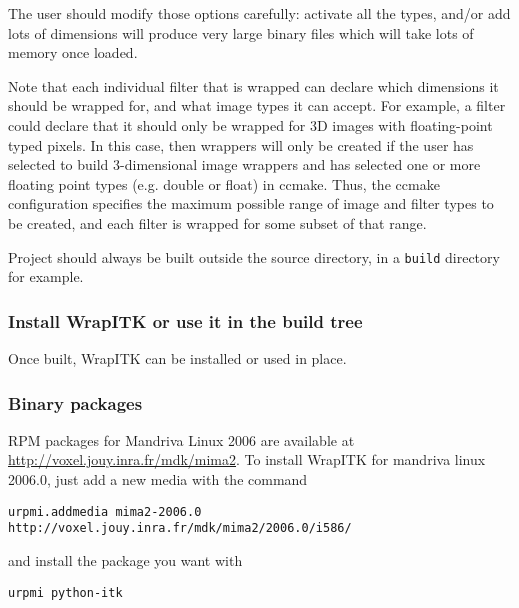 \documentclass{InsightArticle}
\begin{document}
The user should modify those options carefully: activate all the types, and/or
add lots of dimensions will produce very large binary files which will take lots
of memory once loaded.

Note that each individual filter that is wrapped can declare which dimensions it
should be wrapped for, and what image types it can accept. For example, a filter
could declare that it should only be wrapped for 3D images with floating-point
typed pixels. In this case, then wrappers will only be created if the user has
selected to build 3-dimensional image wrappers and has selected one or more
floating point types (e.g. double or float) in ccmake. Thus, the ccmake
configuration specifies the maximum possible range of image and filter types to
be created, and each filter is wrapped for some subset of that range. 

Project should always be built outside the source directory, in a \verb$build$
directory for example.

    \subsubsection{Install WrapITK or use it in the build tree}

Once built, WrapITK can be installed or used in place.

    \subsubsection{Binary packages}

RPM packages for Mandriva Linux 2006 are available at \url{http://voxel.jouy.inra.fr/mdk/mima2}.
To install WrapITK for mandriva linux 2006.0, just add a new media with the
command

\begin{verbatim}
urpmi.addmedia mima2-2006.0 http://voxel.jouy.inra.fr/mdk/mima2/2006.0/i586/
\end{verbatim}

and install the package you want with 

\begin{verbatim}
urpmi python-itk
\end{verbatim}
\end{document}
